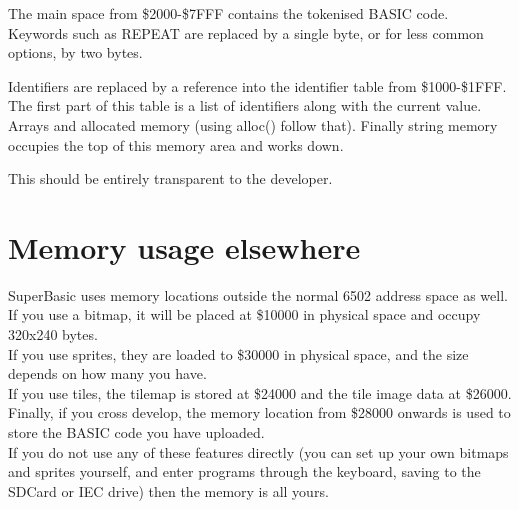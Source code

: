 The main space from \$2000-\$7FFF contains the tokenised BASIC code. Keywords such as REPEAT are replaced by a single byte, or for less common options, by two bytes. 

Identifiers are replaced by a reference into the identifier table from \$1000-\$1FFF. The first part of this table is a list of identifiers along with the current value.
Arrays and allocated memory (using alloc() follow that).
Finally string memory occupies the top of this memory area and works down.

This should be entirely transparent to the developer.

\section{Memory usage elsewhere}

SuperBasic uses memory locations outside the normal 6502 address space as well. \\

If you use a bitmap, it will be placed at \$10000 in physical space and occupy 320x240 bytes.\\

If you use sprites, they are loaded to \$30000 in physical space, and the size depends on how many you have.\\

If you use tiles, the tilemap is stored at \$24000 and the tile image data at \$26000. \\

Finally, if you cross develop, the memory location from \$28000 onwards is used to store the BASIC code you have uploaded.\\

If you do not use any of these features directly (you can set up your own bitmaps and sprites yourself, and enter programs through the keyboard, saving to the SDCard or IEC drive) then the memory is all yours.